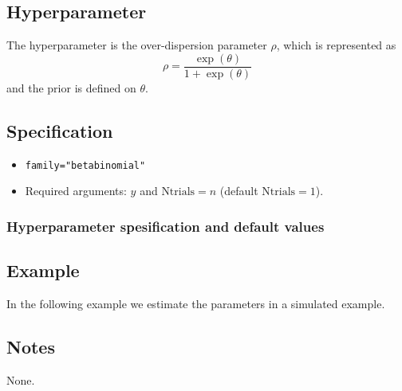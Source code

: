\documentclass[a4paper,11pt]{article}
\begin{document}
\subsection*{Hyperparameter}

The hyperparameter is the over-dispersion parameter $\rho$, which is
represented as
\begin{displaymath}
    \rho = \frac{\exp(\theta)}{1+\exp(\theta)}
\end{displaymath}
and the prior is defined on $\theta$. 

\subsection*{Specification}

\begin{itemize}
\item \texttt{family="betabinomial"}
\item Required arguments: $y$ and $\text{Ntrials} = n$ (default
    $\text{Ntrials}=1$).
\end{itemize}

\subsubsection*{Hyperparameter spesification and default values}



\subsection*{Example}

In the following example we estimate the parameters in a simulated
example.


\subsection*{Notes}

None.
\end{document}
